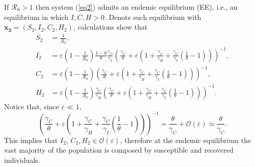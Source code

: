 \documentclass[11pt,reqno]{amsart}
\theoremstyle{boldremark}
\begin{document}
\noindent If $\mathcal{R}_0>1$ then system (\ref{eq2}) admits an endemic equilibrium (EE), i.e., an equilibrium in which $I, C, H > 0$. Denote such equilibrium with $\mathbf{x_2}=(S_2, I_2, C_2, H_2)$, calculations show that 
\begin{equation} \label{eqEE}
\begin{aligned}
    S_2 &= \frac{1}{\mathcal{R}_0}, \\ 
    I_2 &= \varepsilon\left(1-\frac{1}{\mathcal{R}_0}\right) \frac{1-\theta}{\theta} \frac{\gamma_C}{\gamma_I} \left(\frac{\gamma_C}{\theta}+\varepsilon\left(1+\frac{\gamma_C}{\gamma_H}+\frac{\gamma_C}{\gamma_I} \left(\frac{1}{\theta}-1\right)\right)\right)^{-1}, \\ 
    C_2 &= \varepsilon\left(1-\frac{1}{\mathcal{R}_0}\right)  \left(\frac{\gamma_C}{\theta}+\varepsilon\left(1+\frac{\gamma_C}{\gamma_H}+\frac{\gamma_C}{\gamma_I} \left(\frac{1}{\theta}-1\right)\right)\right)^{-1}, \\
    H_2 &= \varepsilon\left(1-\frac{1}{\mathcal{R}_0}\right) \frac{\gamma_C}{\gamma_H} \left(\frac{\gamma_C}{\theta}+\varepsilon\left(1+\frac{\gamma_C}{\gamma_H}+\frac{\gamma_C}{\gamma_I} \left(\frac{1}{\theta}-1\right)\right)\right)^{-1}.
\end{aligned}
\end{equation}
Notice that, since $\varepsilon \ll 1$, 
\begin{equation} \label{eqEEbis}
    \left(\frac{\gamma_C}{\theta}+\varepsilon\left(1+\frac{\gamma_C}{\gamma_H}+\frac{\gamma_C}{\gamma_I} \left(\frac{1}{\theta}-1\right)\right)\right)^{-1} = \frac{\theta}{\gamma_C} + \mathcal{O}(\varepsilon) \simeq \frac{\theta}{\gamma_C}. 
\end{equation} 
This implies that $I_2$, $C_2, H_2 \in \mathcal{O}(\varepsilon)$, therefore at the endemic equilibrium the vast majority of the population is composed by susceptible and recovered individuals.
\end{document}
